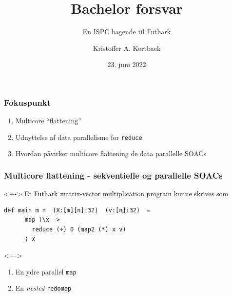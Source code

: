 \documentclass[t]{beamer}
\title{Bachelor forsvar}
\subtitle{En ISPC bagende til Futhark}
\author{Kristoffer A. Kortbaek}
\date{23. juni 2022}
\begin{document}
\begin{frame}
  \titlepage
\end{frame}

\begin{frame}[c]
  \frametitle{Fokuspunkt}

  \begin{enumerate}
    \item<+-> Multicore ``flattening''
    \item<+-> Udnyttelse af data parallelisme for \texttt{reduce}
    \item<+-> Hvordan påvirker multicore flattening de data parallelle SOACs
  \end{enumerate}
\end{frame}

\begin{frame}[fragile]
  \frametitle{Multicore flattening - sekventielle og parallelle SOACs}
  \begin{onlyenv}<+->
    Et Futhark matrix-vector multiplication program kunne skrives som
\begin{lstlisting}[language=futhark]
    def main m n  (X:[m][n]i32)  (v:[n]i32)  =
      map (\x ->
        reduce (+) 0 (map2 (*) x v)
      ) X
\end{lstlisting}
  \end{onlyenv}
  <+->
  \begin{enumerate}
    \item<+-> En ydre parallel \texttt{map}
    \item<+-> En \textit{nested} \texttt{redomap}
  \end{enumerate}


\end{frame}
\end{document}

